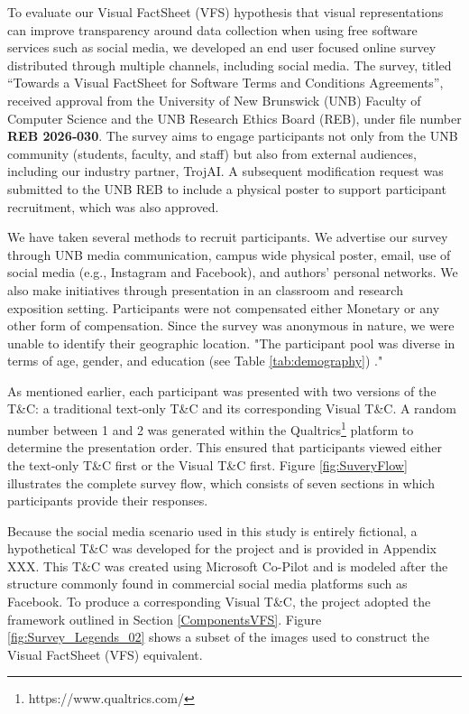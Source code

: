 \documentclass[manuscript,review,anonymous]{acmart}
\begin{document}
	To evaluate our Visual FactSheet (VFS) hypothesis that visual representations can improve transparency around data collection when using free software services such as social media, we developed an end user focused online survey distributed through multiple channels, including social media. The survey, titled \enquote{Towards a Visual FactSheet for Software Terms and Conditions Agreements}, received approval from the University of New Brunswick (UNB) Faculty of Computer Science and the UNB Research Ethics Board (REB), under file number \textbf{REB 2026‑030}. The survey aims to engage participants not only from the UNB community (students, faculty, and staff) but also from external audiences, including our industry partner, TrojAI. A subsequent modification request was submitted to the UNB REB to include a physical poster to support participant recruitment, which was also approved.

	We have taken several methods to recruit participants. We advertise our survey through UNB media communication, campus wide physical poster, email, use of social media (e.g., Instagram and Facebook), and authors’ personal networks. We also make initiatives through presentation in an classroom and research exposition setting. Participants were not compensated either Monetary or any other form of compensation. Since the survey was anonymous in nature, we were unable to identify their geographic location. "The participant pool was diverse in terms of age, gender, and education (see Table \ref{tab:demography}) \cite{10.1145/3613905.3650862}."

	\begin{table}[!h]
		\centering
		\caption{Demography}
		\label{tab:demography}
		
	\end{table}

	As mentioned earlier, each participant was presented with two versions of the T\&C: a traditional text‑only T\&C and its corresponding Visual T\&C. A random number between 1 and 2 was generated within the Qualtrics\footnote{https://www.qualtrics.com/} platform to determine the presentation order. This ensured that participants viewed either the text‑only T\&C first or the Visual T\&C first. Figure \ref{fig:SuveryFlow} illustrates the complete survey flow, which consists of seven sections in which participants provide their responses.

	Because the social media scenario used in this study is entirely fictional, a hypothetical T\&C was developed for the project and is provided in Appendix XXX. This T\&C was created using Microsoft Co-Pilot and is modeled after the structure commonly found in commercial social media platforms such as Facebook. To produce a corresponding Visual T\&C, the project adopted the framework outlined in Section \ref{ComponentsVFS}. Figure \ref{fig:Survey_Legends_02} shows a subset of the images used to construct the Visual FactSheet (VFS) equivalent.
\end{document}
